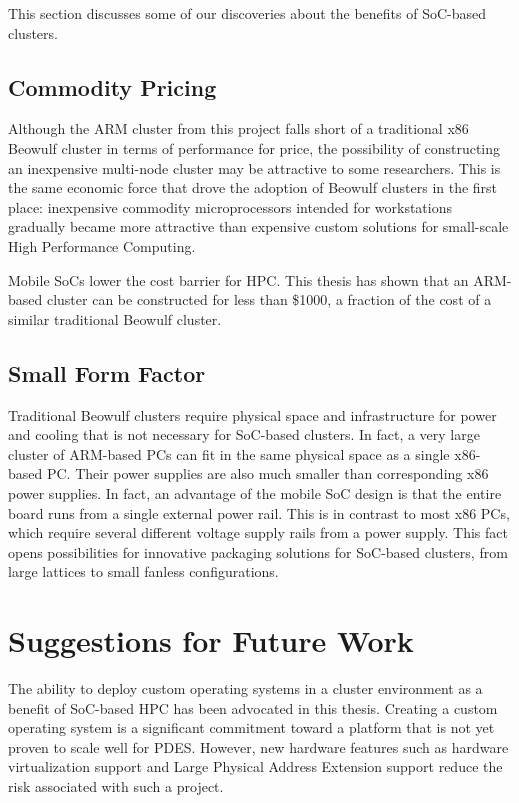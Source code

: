 \documentclass[11pt]{book}
\begin{document}
This section discusses some of our discoveries about the benefits of SoC-based clusters.

\subsection{Commodity Pricing}

Although the ARM cluster from this project falls short of a traditional x86 Beowulf
cluster in terms of performance for price, the possibility of constructing an inexpensive
multi-node cluster may be attractive to some researchers.  This is the same economic force
that drove the adoption of Beowulf clusters in the first place: inexpensive commodity
microprocessors intended for workstations gradually became more attractive than expensive
custom solutions for small-scale High Performance Computing.

Mobile SoCs lower the cost barrier for HPC. This thesis has shown that an ARM-based cluster can be constructed for less than \$1000, a fraction of the cost of a similar traditional Beowulf cluster.

\subsection{Small Form Factor}

Traditional Beowulf clusters require physical space and infrastructure for power and
cooling that is not necessary for SoC-based clusters.  In fact, a very large cluster of
ARM-based PCs can fit in the same physical space as a single x86-based PC.  Their power
supplies are also much smaller than corresponding x86 power supplies.  In fact, an
advantage of the mobile SoC design is that the entire board runs from a single external
power rail.  This is in contrast to most x86 PCs, which require several different voltage
supply rails from a power supply.  This fact opens possibilities for innovative packaging
solutions for SoC-based clusters, from large lattices to small fanless configurations.

\section{Suggestions for Future Work}

The ability to deploy custom operating systems in a cluster environment as a benefit of
SoC-based HPC has been advocated in this thesis.  Creating a custom operating system is a
significant commitment toward a platform that is not yet proven to scale well for PDES.
However, new hardware features such as hardware virtualization support and Large Physical
Address Extension support reduce the risk associated with such a project.
\end{document}
